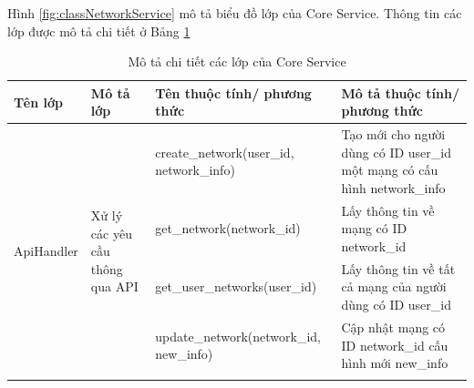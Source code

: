 \documentclass[../DoAn.tex]{subfiles}
\begin{document}
Hình \ref{fig:classNetworkService} mô tả biểu đồ lớp của Core Service. Thông
tin các lớp được mô tả chi tiết ở Bảng \ref{tab:classCoreService}

\begin{longtable}{|p{}|p{}|p{}|p{}|}
    \caption{Mô tả chi tiết các lớp của Core Service}
    \label{tab:classCoreService}                                                                                                                                                                                                                                                                                           \\
    \hline
    Tên lớp                                        & Mô tả lớp                                                                          & Tên thuộc tính/ phương thức                                                       & Mô tả thuộc tính/ phương thức                                                                \\ \hline
    \multirow[t]{11}{0.175\textwidth}{ApiHandler}  & \multirow[t]{11}{0.175\textwidth}{Xử lý các yêu cầu thông qua API}                 & \hspace{0pt}create\_network\hspace{0pt}(user\_id, network\_info)                  & Tạo mới cho người dùng có ID user\_id một mạng có cấu hình network\_info                     \\ \cline{3-4}
                                                   &                                                                                    & \hspace{0pt}get\_network\hspace{0pt}(network\_id)                                 & Lấy thông tin về mạng có ID network\_id                                                      \\ \cline{3-4}
                                                   &                                                                                    & \hspace{0pt}get\_user\_networks\hspace{0pt}(user\_id)                             & Lấy thông tin về tất cả mạng của người dùng có ID user\_id                                   \\ \hline
                                                   &                                                                                    & \hspace{0pt}update\_network\hspace{0pt}(network\_id, new\_info)                   & Cập nhật mạng có ID network\_id cấu hình mới new\_info                                       \\ \cline{3-4}

\end{longtable}
\end{document}
